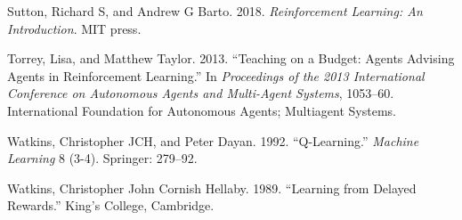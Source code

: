 \documentclass[twocolumn]{article}
\begin{document}
\leavevmode\hypertarget{ref-sutton2018reinforcement}{}Sutton, Richard S, and Andrew G Barto. 2018. \emph{Reinforcement
Learning: An Introduction}. MIT press.

\leavevmode\hypertarget{ref-torrey2013teaching}{}Torrey, Lisa, and Matthew Taylor. 2013. ``Teaching on a Budget: Agents
Advising Agents in Reinforcement Learning.'' In \emph{Proceedings of the
2013 International Conference on Autonomous Agents and Multi-Agent
Systems}, 1053--60. International Foundation for Autonomous Agents;
Multiagent Systems.

\leavevmode\hypertarget{ref-watkins1992q}{}Watkins, Christopher JCH, and Peter Dayan. 1992. ``Q-Learning.''
\emph{Machine Learning} 8 (3-4). Springer: 279--92.

\leavevmode\hypertarget{ref-watkins1989learning}{}Watkins, Christopher John Cornish Hellaby. 1989. ``Learning from Delayed
Rewards.'' King's College, Cambridge.
\end{document}
